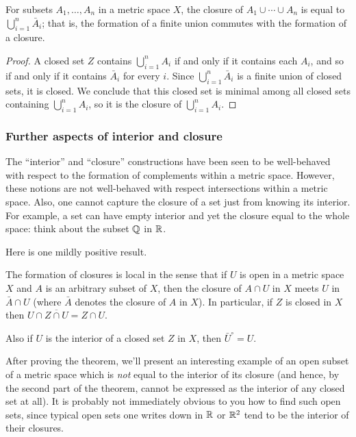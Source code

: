 \begin{corollary}
  For subsets \(A_1,\dotsc,A_n\) in a metric space \(X\), the closure of
  \(A_1\cup\dotsb\cup A_n\) is equal to \(\bigcup_{i=1}^n \bar A_i\); that
  is, the formation of a finite union commutes with the formation of a
  closure.
\end{corollary}
\begin{proof}
  A closed set \(Z\) contains \(\bigcup_{i=1}^n A_i\) if and only if it
  contains each \(A_i\), and so if and only if it contains \(\bar A_i\) for
  every \(i\). Since \(\bigcup_{i=1}^n\bar A_i\) is a finite union of
  closed sets, it is closed. We conclude that this closed set is minimal
  among all closed sets containing \(\bigcup_{i=1}^n A_i\), so it is the
  closure of \(\bigcup_{i=1}^n A_i\).
\end{proof}

\subsubsection{Further aspects of interior and closure}
The ``interior'' and ``closure'' constructions have been seen to be
well-behaved with respect to the formation of complements within a metric
space. However, these notions are not well-behaved with respect
intersections within a metric space. Also, one cannot capture the closure
of a set just from knowing its interior. For example, a set can have empty
interior and yet the closure equal to the whole space: think about the
subset \(\mathbb{Q}\) in \(\mathbb{R}\).

Here is one mildly positive result.
\begin{theorem}
  The formation of closures is local in the sense that if \(U\) is open in
  a metric space \(X\) and \(A\) is an arbitrary subset of \(X\), then the
  closure of \(A\cap U\) in \(X\) meets \(U\) in \(\bar A\cap U\) (where
  \(\bar A\) denotes the closure of \(A\) in \(X\)). In particular, if
  \(Z\) is closed in \(X\) then \(U\cap\overline{Z\cap U}=Z\cap U\).

  Also if \(U\) is the interior of a closed set \(Z\) in \(X\), then
  \({\bar U}^\circ=U\).
\end{theorem}

After proving the theorem, we'll present an interesting example of an open
subset of a metric space which is \emph{not} equal to the interior of its
closure (and hence, by the second part of the theorem, cannot be expressed
as the interior of any closed set at all). It is probably not immediately
obvious to you how to find such open sets, since typical open sets one
writes down in \(\mathbb{R}\) or \(\mathbb{R}^2\) tend to be the interior of their
closures.

